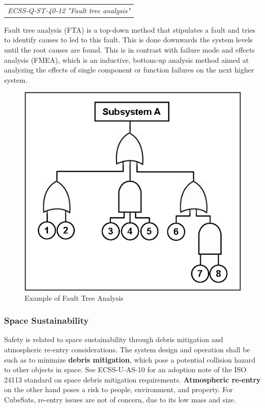 \begin{tabular}{l}
\textit{ECSS-Q-ST-40-12 "Fault tree analysis" \cite{ECSS-Q-ST-40-12}}
\end{tabular}

Fault tree analysis (FTA) is a top-down method that stipulates a fault and tries to identify causes to led to this fault. This is done downwards the system levels until the root causes are found. This is in contrast with failure mode and effects analysis (FMEA), which is an inductive, bottom-up analysis method aimed at analyzing the effects of single component or function failures on the next higher system. 

\begin{figure}[h]
\centering\includegraphics[scale=1.0]{fig/example_of_fault_tree_analysis}
\caption{Example of Fault Tree Analysis}
\label{fig:Example of Fault Tree Analysis}
\end{figure}

\subsubsection{Space Sustainability}

Safety is related to space sustainability through debris mitigation and atmospheric re-entry considerations. The system design and operation shall be such as to minimize \textbf{debris mitigation}, which pose a potential collision hazard to other objects in space. See ECSS-U-AS-10 \cite{ECSS-U-AS-10} for an adoption note of the ISO 24113 standard on space debris mitigation requirements. \textbf{Atmospheric re-entry} on the other hand poses a risk to people, environment, and property. For CubeSats, re-entry issues are not of concern, due to its low mass and size.

